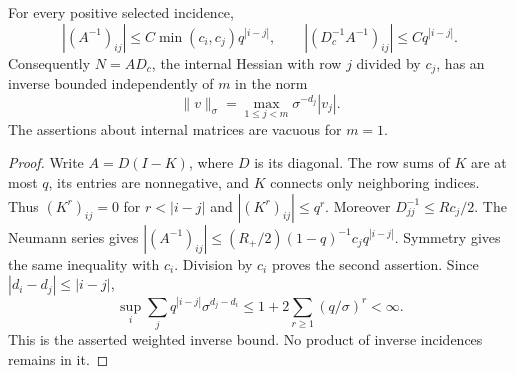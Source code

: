 \begin{lemma}\label{lem:v66-weighted-inverse}
For every positive selected incidence,
\begin{equation}\label{eq:v66-refined-inverse}
 |(A^{-1})_{ij}|\le C\min(c_i,c_j)q^{|i-j|},\qquad
 |(D_c^{-1}A^{-1})_{ij}|\le Cq^{|i-j|}.
\end{equation}
Consequently $N=A D_c$, the internal Hessian with row $j$ divided
by $c_j$, has an inverse bounded independently of $m$ in the norm
\[
 \|v\|_\sigma=\max_{1\le j<m}\sigma^{-d_j}|v_j|.
\]
The assertions about internal matrices are vacuous for $m=1$.
\end{lemma}
\begin{proof}
Write $A=D(I-K)$, where $D$ is its diagonal. The row sums of $K$
are at most $q$, its entries are nonnegative, and $K$ connects only
neighboring indices. Thus $(K^r)_{ij}=0$ for $r<|i-j|$ and
$|(K^r)_{ij}|\le q^r$. Moreover $D_{jj}^{-1}\le Rc_j/2$.
The Neumann series gives
$|(A^{-1})_{ij}|\le (R_+/2)(1-q)^{-1}c_jq^{|i-j|}$.
Symmetry gives the same inequality with $c_i$. Division by $c_i$
proves the second assertion. Since $|d_i-d_j|\le|i-j|$,
\[
 \sup_i\sum_j q^{|i-j|}\sigma^{d_j-d_i}
 \le 1+2\sum_{r\ge1}(q/\sigma)^r<\infty.
\]
This is the asserted weighted inverse bound. No product of inverse
incidences remains in it.
\end{proof}

